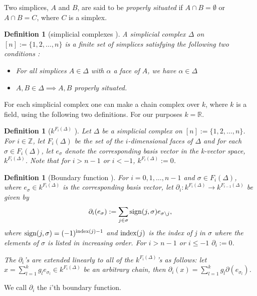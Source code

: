 \documentclass[11pt,a4paper,twoside]{report}
\newtheorem{mydef}[mythm]{Definition}
\begin{document}
Two simplices, $A$ and $B$, are said to be \textit{properly situated} if $A\cap B=\emptyset$ or $A\cap B = C$, where $C$ is a simplex.\cite{Nadathur}

\begin{mydef}[simplicial complexes \cite{Nadathur}]\label{def:simplicial_complexes}
A simplicial complex $\Delta$ on $[n] := \{1,2,\dots ,n\}$ is a finite set of simplices satisfying the following two conditions :
\begin{itemize}
\item For all simplices $A\in\Delta$ with $\alpha$ a face of $A$, we have $\alpha\in\Delta$
\item $A,B\in\Delta\implies A, B $ properly situated.
\end{itemize}
\end{mydef}

For each simplicial complex one can make a chain complex over $k$, where $k$ is a field, using the following two definitions. For our purposes $k=\mathbb{R}$.

\begin{mydef}[$k^{F_i(\Delta)}$ \cite{Allgaier}]
Let $\Delta$ be a simplicial complex on $[n] := \{1,2,\dots ,n\}$. For $i\in \mathbb{Z}$, let $F_i(\Delta)$ be the set of the $i$-dimensional faces of $\Delta$ and for each $\sigma\in F_i(\Delta)$, let $e_{\sigma}$ denote the corresponding basis vector in the k-vector space, $k^{F_i(\Delta)}$. Note that for $i>n-1$ or $i<-1$, $k^{F_i(\Delta)}:=0$.
\end{mydef}

\begin{mydef}[Boundary function \cite{Allgaier}]\label{def:boundary}
For $i=0,1,\dots,n-1$ and $\sigma\in F_i(\Delta)$, where $e_\sigma\in k^{F_i(\Delta)}$ is the corresponding basis vector, let $\partial_i: k^{F_i(\Delta)} \to k^{F_{i-1}(\Delta)}$ be given by 
\begin{equation*}
\partial_i(e_\sigma):=\sum_{j\in\sigma}\textnormal{sign}(j,\sigma)e_{\sigma\setminus j} ,
\end{equation*}
where $\textnormal{sign}(j,\sigma) = (-1)^{\textnormal{index}(j)-1}$ and $\textnormal{index}(j)$ is the index of j in $\sigma$ where the elements of $\sigma$ is listed in increasing order. For $i>n-1$ or $i\leq-1$ $\partial_i:=0$. 

The $\partial_i$'s are extended linearly to all of the $k^{F_i(\Delta)}$'s as follows: let $x = \sum_{l=1}^kg_le_{\sigma_l}\in k^{F_i(\Delta)}$ be an arbitrary chain, then $\partial_i(x)=\sum_{l=1}^kg_l\partial (e_{\sigma_l})$.
\end{mydef}
We call $\partial_i$ the $i$'th boundary function.
\end{document}
